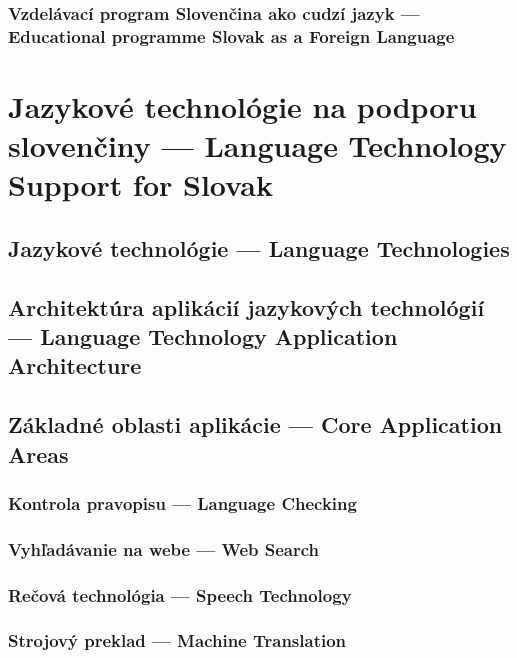 \documentclass[paper=a4]{scrartcl}
\newcommand{\wpsk}[1]{\ParallelLText{\begin{slovak}\setlength\parindent{1em}\frenchspacing#1\end{slovak}}}
\newcommand{\wpen}[1]{\ParallelRText{\begin{english}\setlength\parindent{0pt}\nonfrenchspacing#1\end{english}}}
\begin{document}
\begin{Parallel}[c]{70mm}{70mm}
\subsubsection{Vzdelávací program Slovenčina ako cudzí jazyk --- Educational programme Slovak as a Foreign Language}
\wpsk{}
\wpen{}
\ParallelPar

\section{Jazykové technológie na podporu slovenčiny --- Language Technology Support for Slovak}
\subsection{Jazykové technológie --- Language Technologies}
\wpsk{}
\wpen{}
\ParallelPar

\subsection{Architektúra aplikácií jazykových technológií --- Language Technology Application Architecture}
\wpsk{}
\wpen{}
\ParallelPar

\subsection{Základné oblasti aplikácie --- Core Application Areas}
\subsubsection{Kontrola pravopisu --- Language Checking}
\wpsk{}
\wpen{}
\ParallelPar

\subsubsection{Vyhľadávanie na webe --- Web Search}
\wpsk{}
\wpen{}
\ParallelPar

\subsubsection{Rečová technológia --- Speech Technology}
\wpsk{}
\wpen{}
\ParallelPar

\subsubsection{Strojový preklad --- Machine Translation}
\wpsk{}
\wpen{}
\ParallelPar


\end{Parallel}
\end{document}
